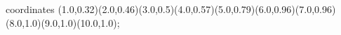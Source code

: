 					coordinates { (1.0,0.32)(2.0,0.46)(3.0,0.5)(4.0,0.57)(5.0,0.79)(6.0,0.96)(7.0,0.96)(8.0,1.0)(9.0,1.0)(10.0,1.0)};